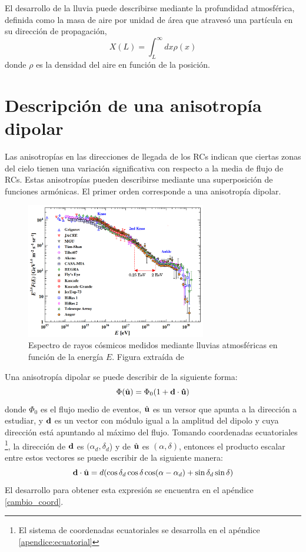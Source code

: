 El desarrollo de la lluvia puede describirse mediante la profundidad atmosférica, definida como la masa de aire por unidad de área que atravesó una partícula en su dirección de propagación, 
\begin{equation}
	X(L)= \int_L^\infty dx \rho(x)
\end{equation}
donde $\rho$ es la densidad del aire en función de la posición.


\section{Descripción de una anisotropía dipolar}
Las anisotropías en las direcciones de llegada de los RCs indican que ciertas zonas del cielo tienen una variación significativa con respecto a la media de flujo de RCs. Estas anisotropías pueden describirse mediante una superposición de funciones armónicas. El primer orden corresponde a una anisotropía dipolar.

\begin{figure}[H]
	\centering
	\includegraphics[width=0.7\textwidth]{auger_spectrum_v2.png}
	\caption{Espectro de rayos cósmicos medidos mediante lluvias atmosféricas en función de la energía $E$. Figura extraída de \cite{PGD}}
	\label{fig:spectra}
\end{figure}


Una anisotropía dipolar se puede describir de la siguiente forma:
\begin{equation}
    \Phi(\hat{\bf{u}}) = \Phi_0(1+\bf{d}\cdot\hat{\bf{u}})
    \label{eq:dipolo_general}
\end{equation}
\noindent donde $\Phi_0$ es el flujo medio de eventos, $\hat{\bf{u}}$ es un versor que apunta a la dirección a estudiar, y $\bf{d}$ es un vector con módulo igual a la amplitud del dipolo y cuya dirección está apuntando al máximo del flujo. Tomando coordenadas ecuatoriales \footnote{El sistema de coordenadas ecuatoriales se desarrolla en el apéndice \ref{apendice:ecuatorial}}, la dirección de $\bf{d}$ es $(\alpha_d, \delta_d$) y de $\hat{\bf{u}}$ es $(\alpha, \delta)$, entonces  el producto escalar  entre estos vectores se puede escribir de la siguiente manera:
\begin{equation}
    \textbf{d}\cdot\hat{\bf{u}}= d (\cos\delta_d \cos\delta \cos(\alpha - \alpha_d) + \sin\delta_d  \sin\delta)
    \label{eq:product_ud}
\end{equation}
El desarrollo para obtener esta expresión se encuentra en el apéndice \ref{cambio_coord}.

